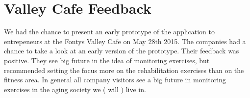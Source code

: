 \section{Valley Cafe Feedback}
We had the chance to present an early prototype of the application to entrepeneurs at the Fontys Valley Cafe on May 28th 2015.
The companies had a chance to take a look at an early version of the prototype. Their feedback was positive. They see big future in the idea of monitoring exercises, but recommended setting the focus more on the rehabilitation exercises than on the fitness area. In general all company visitors see a big future in monitoring exercises in the aging society we ( will ) live in.
